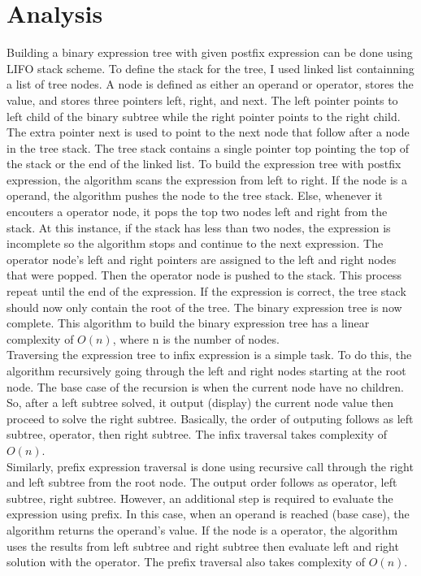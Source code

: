 \documentclass[11pt]{article}
\begin{document}
\pagebreak
\section{Analysis}
Building a binary expression tree with given postfix expression can be done using LIFO stack scheme.
To define the stack for the tree, I used linked list containning a list of tree nodes.
A node is defined as either an operand or operator, stores the value, and stores three pointers left, right, and next.
The left pointer points to left child of the binary subtree while the right pointer points to the right child.
The extra pointer next is used to point to the next node that follow after a node in the tree stack.
The tree stack contains a single pointer top pointing the top of the stack or the end of the linked list.
To build the expression tree with postfix expression, the algorithm scans the expression from left to right.
If the node is a operand, the algorithm pushes the node to the tree stack.
Else, whenever it encouters a operator node, it pops the top two nodes left and right from the stack.
At this instance, if the stack has less than two nodes, the expression is incomplete so the algorithm stops and continue to the next expression.
The operator node's left and right pointers are assigned to the left and right nodes that were popped.
Then the operator node is pushed to the stack.
This process repeat until the end of the expression.
If the expression is correct, the tree stack should now only contain the root of the tree.
The binary expression tree is now complete.
This algorithm to build the binary expression tree has a linear complexity of $O(n)$, where n is the number of nodes.\\

Traversing the expression tree to infix expression is a simple task.
To do this, the algorithm recursively going through the left and right nodes starting at the root node.
The base case of the recursion is when the current node have no children.
So, after a left subtree solved, it output (display) the current node value then proceed to solve the right subtree.
Basically, the order of outputing follows as left subtree, operator, then right subtree.
The infix traversal takes complexity of $O(n)$.\\

Similarly, prefix expression traversal is done using recursive call through the right and left subtree from the root node.
The output order follows as operator, left subtree, right subtree.
However, an additional step is required to evaluate the expression using prefix.
In this case, when an operand is reached (base case), the algorithm returns the operand's value.
If the node is a operator, the algorithm uses the results from left subtree and right subtree then evaluate left and right solution with the operator.
The prefix traversal also takes complexity of $O(n)$.\\
\end{document}
